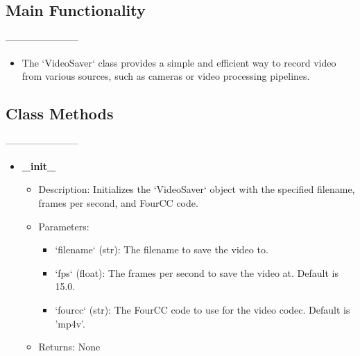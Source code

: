 \documentclass{article}
\begin{document}
\subsection{Main Functionality}
-----------------------

\begin{itemize}
    \item The `VideoSaver` class provides a simple and efficient way to record video from various sources, such as cameras or video processing pipelines.
\end{itemize}

\subsection{Class Methods}
-----------------------

\begin{itemize}
    \item \textbf{\_init\_}
        \begin{itemize}
            \item Description: Initializes the `VideoSaver` object with the specified filename, frames per second, and FourCC code.
            \item Parameters:
                \begin{itemize}
                    \item {`filename` (str):} The filename to save the video to.
                    \item {`fps` (float):} The frames per second to save the video at. Default is 15.0.
                    \item {`fourcc` (str):} The FourCC code to use for the video codec. Default is 'mp4v'.
                \end{itemize}
            \item Returns: None
        \end{itemize}
    \end{itemize}
\end{document}
